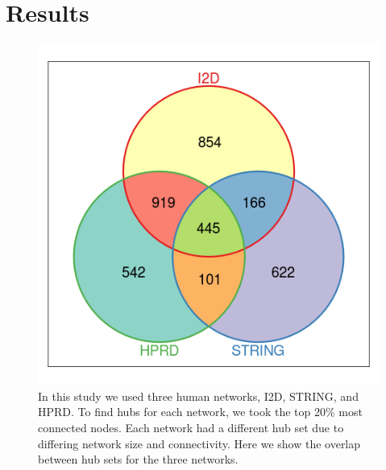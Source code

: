 

\section{Results}

\begin{figure}
\begin{center}
\includegraphics[scale=0.5]{figs/hubs_overlap}
\end{center}
\caption[Comparing hubs across human interactomes]{\small In this
  study we used three human networks, I2D, STRING, and HPRD. To find
  hubs for each network, we took the top 20\% most connected
  nodes. Each network had a different hub set due to differing network
  size and connectivity. Here we show the overlap between hub sets for
  the three networks. \label{fig:sysBio:hubOverlap}}
\end{figure}

